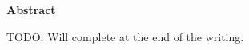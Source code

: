 \newpage
{\Huge \bf Abstract}
\vspace{24pt}

TODO: Will complete at the end of the writing.

\newpage
\vspace*{\fill}
